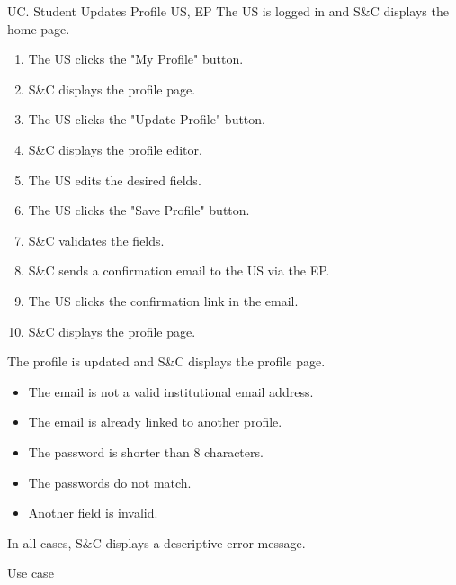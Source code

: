 \clearpage
\begin{usecase}
    {UC\theuc. Student Updates Profile}
    {US, EP}
    {The US is logged in and S\&C displays the home page.}
    {\begin{enumerate}[leftmargin=*]
        \item The US clicks the "My Profile" button.
        \item S\&C displays the profile page.
        \item The US clicks the "Update Profile" button.
        \item S\&C displays the profile editor.
        \item The US edits the desired fields.
        \item The US clicks the "Save Profile" button.
        \item S\&C validates the fields.
        \item S\&C sends a confirmation email to the US via the EP.
        \item The US clicks the confirmation link in the email.
        \item S\&C displays the profile page.
    \end{enumerate}}
    {The profile is updated and S\&C displays the profile page.}
    {\begin{itemize}[leftmargin=*, label=\tiny\textbullet]
        \item The email is not a valid institutional email address.
        \item The email is already linked to another profile.
        \item The password is shorter than 8 characters.
        \item The passwords do not match.
        \item Another field is invalid.
    \end{itemize}
    In all cases, S\&C displays a descriptive error message.}
    {Use case \theuc}
\end{usecase}

